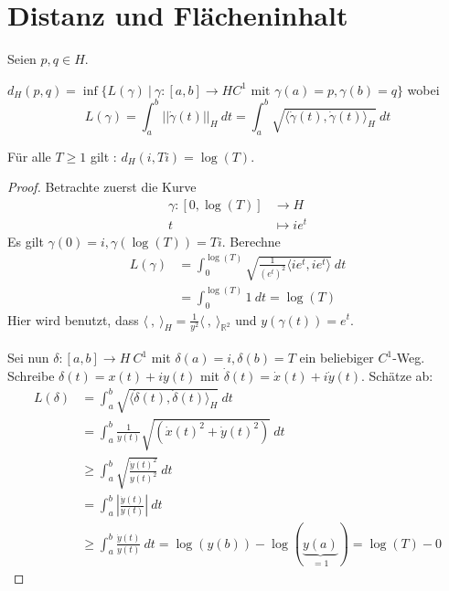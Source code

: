 \documentclass[../main.tex]{subfiles}
\begin{document}
\section{Distanz und Flächeninhalt}
Seien $p, q \in H$.
\begin{definition}
    $d_H (p,q) = \inf \{L(\gamma) \ | \ \gamma : [a,b] \to H C^1 \text{ mit } \gamma (a)=p, \gamma(b)=q \}$
    wobei
    $$L(\gamma) = \int_a^b || \dot{\gamma}(t)||_H \ dt = \int _a^b \sqrt{\langle \dot{\gamma}(t), \dot{\gamma}(t) \rangle _H} \ dt$$
\end{definition}

\begin{lemma}
    Für alle $T \ge 1$ gilt : $d _H (i, Ti) = \log (T)$.
\end{lemma}
\begin{proof}
    Betrachte zuerst die Kurve
    \begin{align*}
        \gamma : [0, \log(T)] & \to H \\
        t & \mapsto ie^t
    \end{align*}
    Es gilt $\gamma(0) = i, \gamma(\log(T))= Ti$. Berechne
    \begin{align*}
        L (\gamma) &= \int _0 ^{\log (T)} \sqrt{\frac{1}{(e^t)^2}\langle ie^t, ie^t \rangle} \ dt \\
        &= \int _0 ^{\log (T)} 1 \ dt = \log (T)
    \end{align*}
    Hier wird benutzt, dass $\langle \ , \ \rangle _H = \frac{1}{y^2} \langle \ , \ \rangle _ {\mathbb{R}^2}$ und $y(\gamma (t))= e^t$.
    \\ \\
    Sei nun $\delta :[a,b] \to H \ C^1$ mit $\delta (a) =i, \delta (b)=T$ ein beliebiger $C^1$-Weg.
    Schreibe $\delta (t) = x(t)+ iy(t)$ mit $\dot{\delta}(t)=\dot{x}(t)+i\dot{y}(t)$.
    Schätze ab:
    \begin{align*}
        L (\delta) &= \int _a ^b \sqrt{\langle \dot{\delta}(t), \dot{\delta}(t) \rangle _H} \ dt \\
        &= \int _a ^b \frac{1}{y(t)} \sqrt{(\dot{x}(t)^2+\dot{y}(t)^2)} \ dt \\
        & \ge \int _a ^b \sqrt{\frac{\dot{y}(t)^2}{y(t)^2}} \ dt \\
        &= \int _a ^b \left | \frac{\dot{y}(t)}{y(t)} \right | \ dt \\
        &\ge \int _a ^b \frac{\dot{y}(t)}{y(t)} \ dt = \log (y(b)) - \log(\underbrace{y(a)}_{=1})= \log(T) - 0
    \end{align*}
    
\end{proof}
\end{document}
